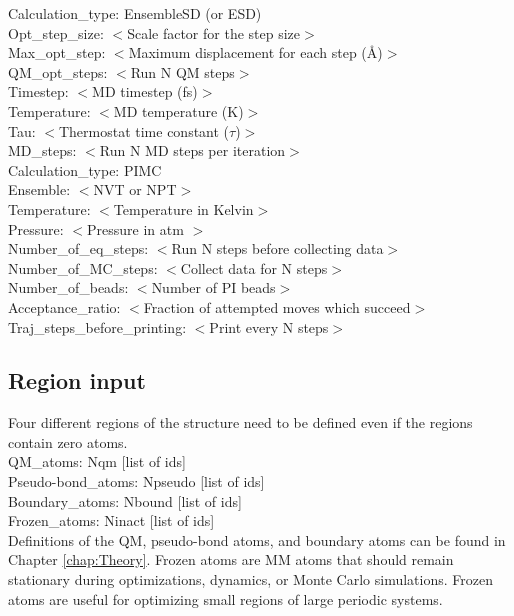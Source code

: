 \documentclass[12pt]{report}
\begin{document}
Calculation\_type: EnsembleSD (or ESD) \\
Opt\_step\_size: $<$Scale factor for the step size$>$ \\
Max\_opt\_step: $<$Maximum displacement for each step (\AA)$>$ \\
QM\_opt\_steps: $<$Run N QM steps$>$ \\
Timestep: $<$MD timestep (fs)$>$ \\
Temperature: $<$MD temperature (K)$>$ \\
Tau: $<$Thermostat time constant ($\tau$)$>$ \\
MD\_steps: $<$Run N MD steps per iteration$>$ \\

Calculation\_type: PIMC \\
Ensemble: $<$NVT or NPT$>$ \\
Temperature: $<$Temperature in Kelvin$>$ \\
Pressure: $<$Pressure in atm $>$ \\
Number\_of\_eq\_steps: $<$Run N steps before collecting data$>$ \\
Number\_of\_MC\_steps: $<$Collect data for N steps$>$ \\
Number\_of\_beads: $<$Number of PI beads$>$ \\
Acceptance\_ratio: $<$Fraction of attempted moves which succeed$>$ \\
Traj\_steps\_before\_printing: $<$Print every N steps$>$ \\

\subsection{Region input}

Four different regions of the structure need to be defined even if the
regions contain zero atoms. \\

QM\_atoms: Nqm [list of ids] \\
Pseudo-bond\_atoms: Npseudo [list of ids] \\
Boundary\_atoms: Nbound [list of ids] \\
Frozen\_atoms: Ninact [list of ids] \\

Definitions of the QM, pseudo-bond atoms, and boundary atoms can be found in
Chapter \ref{chap:Theory}.
Frozen atoms are MM atoms that should remain stationary during optimizations,
dynamics, or Monte Carlo simulations.
Frozen atoms are useful for optimizing small regions of large periodic
systems. \\
\end{document}
